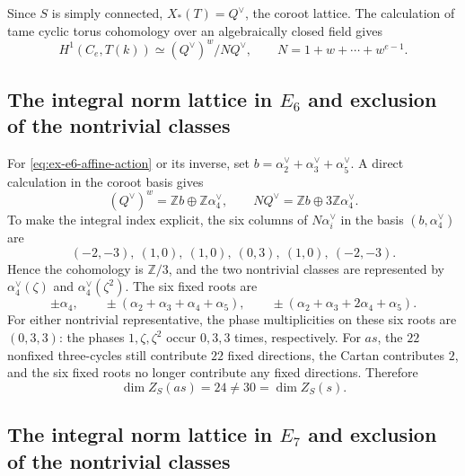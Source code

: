 \documentclass[11pt,a4paper]{article}
\theoremstyle{definition}
\theoremstyle{remark}
\begin{document}
Since \(S\) is simply connected, \(X_*(T)=Q^\vee\), the coroot lattice.
The calculation of tame cyclic torus cohomology over an algebraically
closed field gives
\begin{equation}\label{eq:ex-torus-cohomology}
H^1(C_e,T(k))\simeq(Q^\vee)^w/NQ^\vee,
\qquad N=1+w+\cdots+w^{e-1}.
\end{equation}

\subsection{The integral norm lattice in \(E_6\) and exclusion of the nontrivial classes}
\label{subsec:ex-e6-norm}

For \eqref{eq:ex-e6-affine-action} or its inverse, set
\(b=\alpha_2^\vee+\alpha_3^\vee+\alpha_5^\vee\).
A direct calculation in the coroot basis gives
\begin{equation}\label{eq:ex-e6-norm-lattices}
(Q^\vee)^w=\mathbb Zb\oplus\mathbb Z\alpha_4^\vee,
\qquad
NQ^\vee=\mathbb Zb\oplus3\mathbb Z\alpha_4^\vee.
\end{equation}
To make the integral index explicit, the six columns of
\(N\alpha_i^\vee\) in the basis \((b,\alpha_4^\vee)\) are
\begin{equation}\label{eq:ex-e6-norm-columns}
(-2,-3),\ (1,0),\ (1,0),\ (0,3),\ (1,0),\ (-2,-3).
\end{equation}
Hence the cohomology is \(\mathbb Z/3\), and the two nontrivial classes
are represented by
\(\alpha_4^\vee(\zeta)\) and \(\alpha_4^\vee(\zeta^2)\).
The six fixed roots are
\begin{equation}\label{eq:ex-e6-fixed-roots}
\pm\alpha_4,\qquad
\pm(\alpha_2+\alpha_3+\alpha_4+\alpha_5),\qquad
\pm(\alpha_2+\alpha_3+2\alpha_4+\alpha_5).
\end{equation}
For either nontrivial representative, the phase multiplicities on these
six roots are \((0,3,3)\): the phases \(1,\zeta,\zeta^2\) occur
\(0,3,3\) times, respectively.
For \(as\), the \(22\) nonfixed three-cycles still contribute \(22\)
fixed directions, the Cartan contributes \(2\), and the six fixed roots
no longer contribute any fixed directions.
Therefore
\begin{equation}\label{eq:ex-e6-nontrivial-dimension}
\dim Z_S(as)=24\ne30=\dim Z_S(s).
\end{equation}

\subsection{The integral norm lattice in \(E_7\) and exclusion of the nontrivial classes}
\label{subsec:ex-e7-norm}
\end{document}
